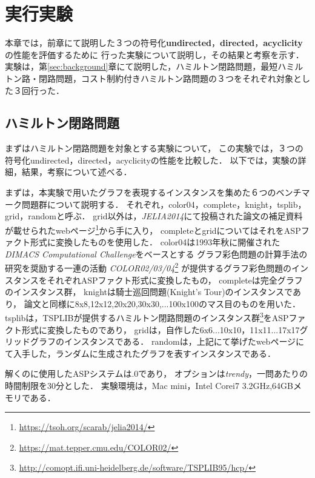 \chapter{実行実験}
本章では，前章にて説明した３つの符号化\textbf{undirected}，\textbf{directed}，\textbf{acyclicity}の性能を評価するために
行った実験について説明し，その結果と考察を示す．
実験は，第\ref{sec:background}章にて説明した，ハミルトン閉路問題，最短ハミルトン路・閉路問題，コスト制約付きハミルトン路問題の３つをそれぞれ対象とした３回行った．
\section{ハミルトン閉路問題}
まずはハミルトン閉路問題を対象とする実験について，
この実験では，３つの符号化undirected，directed，acyclicityの性能を比較した．
以下では，実験の詳細，結果，考察について述べる．

まずは，本実験で用いたグラフを表現するインスタンスを集めた６つのベンチマーク問題群について説明する．
それぞれ，color04，complete，knight，tsplib，grid，randomと呼ぶ．
grid以外は，\textit{JELIA2014}にて投稿された論文\cite{soh14}の補足資料
が載せられたwebページ\footnote{\url{https://tsoh.org/scarab/jelia2014/}}から手に入り，
completeとgridについてはそれをASPファクト形式に変換したものを使用した．
color04は1993年秋に開催された\textit{DIMACS Computational Challenge}をベースとする
グラフ彩色問題の計算手法の研究を奨励する一連の活動
\textit{COLOR02/03/04}\footnote{\url{https://mat.tepper.cmu.edu/COLOR02/}}
が提供するグラフ彩色問題のインスタンスをそれぞれASPファクト形式に変換したもの，
completeは完全グラフのインスタンス群，
knightは騎士巡回問題(Knight's Tour)のインスタンスであり，
論文\cite{soh14}と同様に8x8,12x12,20x20,30x30,...100x100のマス目のものを用いた．
tsplibは，TSPLIBが提供するハミルトン閉路問題のインスタンス群\footnote{\url{http://comopt.ifi.uni-heidelberg.de/software/TSPLIB95/hcp/}}をASPファクト形式に変換したものであり，
gridは，自作した6x6...10x10，11x11...17x17グリッドグラフのインスタンスである．
randomは，上記にて挙げたwebページ\footnotemark[1]にて入手した，ランダムに生成されたグラフを表すインスタンスである．

解くのに使用したASPシステムは.0であり，
オプションは\textit{trendy}，一問あたりの時間制限を30分とした．
実験環境は，Mac mini，Intel Corei7 3.2GHz,64GBメモリである．

